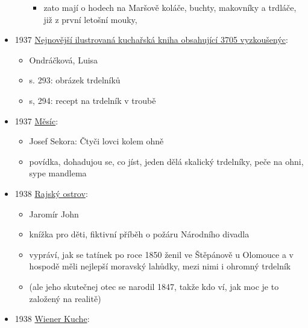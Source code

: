 \begin{itemize}
\begin{itemize}
    \begin{itemize}
    \tightlist
    \item
      zato mají o hodech na Maršově koláče, buchty, makovníky a trdláče,
      již z první letošní mouky,
    \end{itemize}
  \end{itemize}
\item
  1937
  \href{https://ceskadigitalniknihovna.cz/uuid/uuid:6f308ed0-4eaf-11ed-8756-005056827e51}{Nejnovější
  ilustrovaná kuchařská kniha obsahující 3705 vyzkoušenýc}:

  \begin{itemize}
  \tightlist
  \item
    Ondráčková, Luisa
  \item
    s. 293: obrázek trdelníků
  \item
    s, 294: recept na trdelník v troubě
  \end{itemize}
\item
  1937
  \href{https://ceskadigitalniknihovna.cz/uuid/uuid:0e56bea0-5587-11e5-81eb-001018b5eb5c}{Měsíc}:

  \begin{itemize}
  \tightlist
  \item
    Josef Sekora: Čtyči lovci kolem ohně
  \item
    povídka, dohadujou se, co jíst, jeden dělá skalický trdelníky, peče
    na ohni, sype mandlema
  \end{itemize}
\item
  1938
  \href{https://ndk.cz/view/uuid:001e82b0-302a-11e9-b81e-005056827e52?page=uuid\%3A3123a720-50df-11e9-8854-005056827e51&fulltext=trdeln\%C3\%ADk}{Rajský
  ostrov}:

  \begin{itemize}
  \tightlist
  \item
    Jaromír John
  \item
    knížka pro děti, fiktivní příběh o požáru Národního divadla
  \item
    vypráví, jak se tatínek po roce 1850 ženil ve Štěpánově u Olomouce a
    v hospodě měli nejlepší moravský lahůdky, mezi nimi i ohromný
    trdelník
  \item
    (ale jeho skutečnej otec se narodil 1847, takže kdo ví, jak moc je
    to založený na realitě)
  \end{itemize}
\item
  1938
  \href{https://web.archive.org/web/20201230125915/http://kurtos.eu/dl/11664.pdf}{Wiener
  Kuche}:


\end{itemize}
